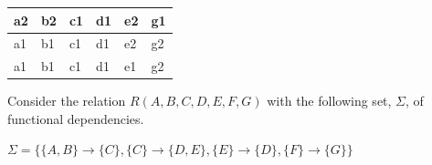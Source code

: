 \documentclass[10pt,a4paper,answers]{exam}
\newcounter{sol}
\begin{document}
\begin{questions}
\begin{solution}
\begin{enumerate}
\begin{center}
\begin{tabular}{|l|l|l|l|l|l|}
				a2                                                       & b2                                                      & c1                                                      & d1                                                      & e2                                                      & g1                                                                             \\ \hline
				a1                                                       & b1                                                      & c1                                                      & d1                                                      & e2                                                      & g2                                                                             \\ \hline
				a1                                                       & b1                                                      & c1                                                      & d1                                                      & e1                                                      & g2                                                                             \\ \hline
			\end{tabular}
		\end{center}
	\end{enumerate}
	
\end{solution}

\question Consider the  relation $R(A, B, C, D, E, F, G)$ with the following set, $\Sigma$, of functional dependencies. 

$\Sigma = \{ \{A, B\} \rightarrow \{C\}, \{C\} \rightarrow \{D, E\}, \{E\} \rightarrow \{D\}, \{F\} \rightarrow \{G\}\}$

\begin{parts}

\end{parts}
\end{questions}
\end{document}

